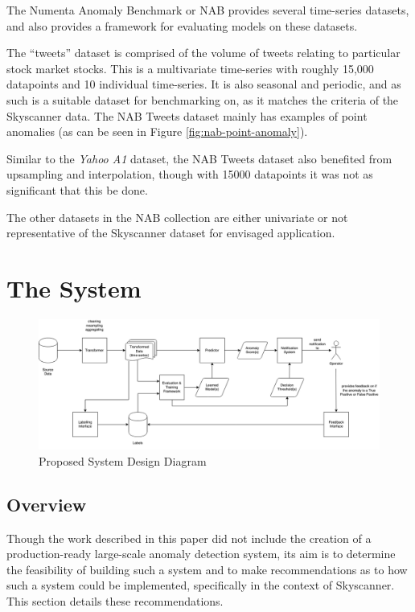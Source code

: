 \documentclass{mpaper}
\begin{document}
The Numenta Anomaly Benchmark \citep{NAB} or NAB provides several time-series datasets, and also provides a framework for evaluating models on these datasets.

The ``tweets'' dataset is comprised of the volume of tweets relating to particular stock market stocks. This is a multivariate time-series with roughly 15,000 datapoints and 10 individual time-series. It is also seasonal and periodic, and as such is a suitable dataset for benchmarking on, as it matches the criteria of the Skyscanner data. The NAB Tweets dataset mainly has examples of point anomalies (as can be seen in Figure \ref{fig:nab-point-anomaly}).

Similar to the \textit{Yahoo A1} dataset, the NAB Tweets dataset also benefited from upsampling and interpolation, though with 15000 datapoints it was not as significant that this be done.

The other datasets in the NAB collection are either univariate or not representative of the Skyscanner dataset for envisaged application.

\section{The System}
\label{section:the-system}

\begin{figure}[ht]
	\graphicspath{{img/}}
	\includegraphics[width=\textwidth]{AnomalyDetectionSystemDesign.png}
	\caption{Proposed System Design Diagram}
	\label{fig:system-design}
\end{figure}


\subsection{Overview}
Though the work described in this paper did not include the creation of a production-ready large-scale anomaly detection system, its aim is to determine the feasibility of building such a system and to make recommendations as to how such a system could be implemented, specifically in the context of Skyscanner. This section details these recommendations.
\end{document}
